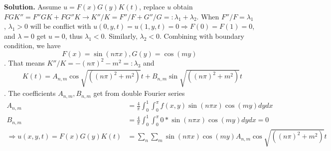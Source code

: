 \documentclass[a4paper]{book}
\newenvironment{solution}%
{\noindent\textbf{Solution.}}%
{\qedhere}
\numberwithin{equation}{chapter}
\theoremstyle{definition}
\begin{document}
\begin{solution}
Assume $u = F(x) G(y) K(t)$, replace $u$ obtain $FGK'' = F''GK + FG''K \rightarrow K''/K = F''/F +
G''/G =: \lambda_1 + \lambda_2 $. 
    When $F''/F = \lambda_1$, $\lambda_1 > 0$ will be conflict with 
    $u(0, y, t) = u(1, y, t) = 0 \Rightarrow F(0) = F(1) = 0$, and $\lambda = 0$
    get $u = 0$, thus $\lambda_1 < 0$. Similarly, $\lambda_2 < 0$. 
    Combining with boundary condition, we have 
    \[F(x) = \sin (n \pi x), G(y) = \cos (m y)\].
    That means $K''/K = -(n\pi)^2 - m^2 =: \lambda_3$ and 
    \begin{align*}
        &K(t) = A_{n, m} \cos \sqrt{((n\pi)^2 + m^2) } t + B_{n, m} \sin \sqrt{((n\pi)^2 + m^2) } t
    \end{align*}.
    The coefficients $A_{n, m}, B_{n, m}$ get from double Fourier series 
    \begin{align*}
        A_{n, m} &= \frac{4}{\pi} \int_0^1 \int_0^{\pi} f(x, y)\sin (n \pi x) \cos (m y)  dy dx \\
        B_{n, m} &= \frac{4}{\pi} \int_0^1 \int_0^{\pi} 0 *\sin (n \pi x) \cos (m y)  dy dx = 0 \\
        \Rightarrow u(x, y, t) = F(x)G(y)K(t) &= \sum_n \sum_m \sin (n \pi x) \cos (m y)  A_{n, m} \cos \sqrt{((n\pi)^2 + m^2) } t  
    \end{align*}
\end{solution}
\end{document}
